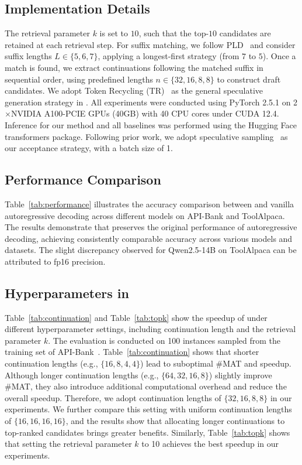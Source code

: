 \subsection{Implementation Details} 
\label{appendix:impl_details}
The retrieval parameter $k$ is set to $10$, such that the top-$10$ candidates are retained at each retrieval step. For suffix matching, we follow PLD~\citep{saxena2023pld} and consider suffix lengths $L \in \{5,6,7\}$, applying a longest-first strategy (from $7$ to $5$). Once a match is found, we extract continuations following the matched suffix in sequential order, using predefined lengths $n \in \{32, 16, 8, 8\}$ to construct draft candidates. We adopt Token Recycling (TR)~\citep{luo:2025tokenrecycle} as the general speculative generation strategy in \method. All experiments were conducted using PyTorch 2.5.1 on 2$\times$NVIDIA A100-PCIE GPUs (40GB) with 40 CPU cores under CUDA 12.4. Inference for our method and all baselines was performed using the Hugging Face transformers package. Following prior work, we adopt speculative sampling~\citep{leviathan:2023spec} as our acceptance strategy, with a batch size of 1.

\subsection{Performance Comparison} 
\label{appendix:performance}
Table~\ref{tab:performance} illustrates the accuracy comparison between \method and vanilla autoregressive decoding across different models on API-Bank and ToolAlpaca. The results demonstrate that \method preserves the original performance of autoregressive decoding, achieving consistently comparable accuracy across various models and datasets. The slight discrepancy observed for Qwen2.5-14B on ToolAlpaca can be attributed to fp16 precision.



\subsection{Hyperparameters in \method}
Table~\ref{tab:continuation} and Table~\ref{tab:topk} show the speedup of \method under different hyperparameter settings, including continuation length and the retrieval parameter $k$. The evaluation is conducted on 100 instances sampled from the training set of API-Bank~\citep{apibank}. Table~\ref{tab:continuation} shows that shorter continuation lengths (e.g., $\{16, 8, 4, 4\}$) lead to suboptimal \#MAT and speedup. Although longer continuation lengths (e.g., $\{64, 32, 16, 8\}$) slightly improve \#MAT, they also introduce additional computational overhead and reduce the overall speedup. Therefore, we adopt continuation lengths of $\{32, 16, 8, 8\}$ in our experiments. We further compare this setting with uniform continuation lengths of $\{16, 16, 16, 16\}$, and the results show that allocating longer continuations to top-ranked candidates brings greater benefits. Similarly, Table~\ref{tab:topk} shows that setting the retrieval parameter $k$ to 10 achieves the best speedup in our experiments.

